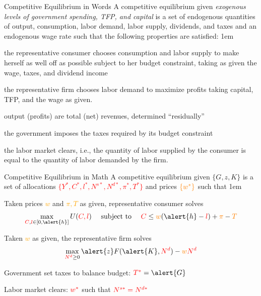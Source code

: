 \documentclass[11pt,aspectratio=43]{beamer}
\newcommand{\orange}[1]{\textcolor{orange}{#1}}
\newcommand{\red}[1]{\textcolor{red}{#1}}
\let\oldenumerate=\enumerate
\let\endoldenumerate=\endenumerate
\renewenvironment{enumerate}{\oldenumerate \itemsep1em}{ \endoldenumerate}
\theoremstyle{definition}
\begin{document}
\begin{frame}{Competitive Equilibrium in Words}
\label{slide:Competitive_Equilibrium_in_Words}
    \footnotesize
    A competitive equilibrium given \textit{exogenous levels of government spending, TFP, and capital} is a set of \alert{endogenous quantities of output, consumption, labor demand, labor supply, dividends, and taxes and an endogenous wage rate} such that the following properties are satisfied:
    \begin{enumerate}
        \item the representative consumer chooses \alert{consumption and labor supply} to make herself as well off as possible subject to her budget constraint, taking as \alert{given the wage, taxes, and dividend income}
        \item the representative firm chooses \alert{labor demand} to maximize profits taking \alert{capital, TFP, and the wage as given}.
        \item output (profits) are total (net) revenues, determined ``residually''
        \item the government imposes the \alert{taxes} required by its budget constraint
        \item the \alert{labor market clears}, i.e., the quantity of labor supplied by the consumer is equal to the quantity of labor demanded by the firm.
    \end{enumerate}
\end{frame}

\begin{frame}{Competitive Equilibrium in Math}
\label{slide:Competitive_Equilibrium_in_Math}
    A \alert{competitive equilibrium} given \alert{$ \{ G, z, K \} $} is a set of allocations \red{$ \{ Y^{*}, C^{*}, l^{*}, N^{s*}, N^{d*}, \pi^{*}, T^{*} \}$} and prices $ \orange{\{ w^{*} \}} $ such that
    \begin{enumerate}
        \item Taken prices \orange{$w$} and \orange{$\pi, T$} as given, representative consumer solves
        \begin{equation}
        \label{eq:consumer_problem}
            \max_{\red{C}, \red{l} \in [ 0, \alert{h} ]} U( \red{C, l} ) \quad \text{ subject to } \quad \red{C} \le \orange{w} ( \alert{h} - \red{l} ) + \orange{\pi} - \orange{T}
        \end{equation}
        \item Taken \orange{$w$} as given, the representative firm solves
        \begin{equation}
        \label{eq:firm_problem}
            \max_{\red{N^{d}} \ge 0} \alert{z} F( \alert{K}, \red{N^{d}} ) - \orange{w} \red{N^{d}}
        \end{equation}
        \item Government set taxes to balance budget: $ \red{T^{*}} = \alert{G} $
        \item Labor market clears: $ \red{w^{*}} $ such that $ \red{N^{s*} = N^{d*}} $
    \end{enumerate}
\end{frame}
\end{document}
